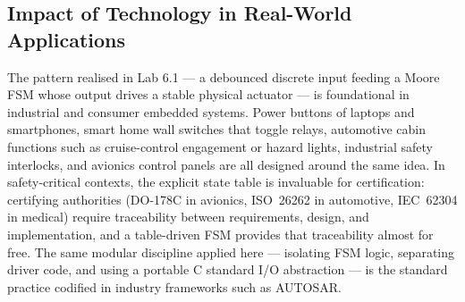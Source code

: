 \subsection{Impact of Technology in Real-World Applications}

The pattern realised in Lab 6.1 --- a debounced discrete input feeding a Moore FSM whose output drives a stable physical actuator --- is foundational in industrial and consumer embedded systems. Power buttons of laptops and smartphones, smart home wall switches that toggle relays, automotive cabin functions such as cruise-control engagement or hazard lights, industrial safety interlocks, and avionics control panels are all designed around the same idea. In safety-critical contexts, the explicit state table is invaluable for certification: certifying authorities (DO-178C in avionics, ISO~26262 in automotive, IEC~62304 in medical) require traceability between requirements, design, and implementation, and a table-driven FSM provides that traceability almost for free. The same modular discipline applied here --- isolating FSM logic, separating driver code, and using a portable C standard I/O abstraction --- is the standard practice codified in industry frameworks such as AUTOSAR.
